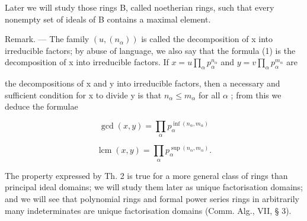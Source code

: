 Later we will study those rings B, called noetherian rings, such that every nonempty set of ideals of B contains a maximal element.

Remark. --- The family \((u, (n_{\alpha}))\) is called the decomposition of x into irreducible factors; by abuse of language, we also say that the formula (1) is the decomposition of x into irreducible factors. If \(x = u \prod_{\alpha} p_{\alpha}^{n_{\alpha}}\) and \(y = v \prod_{\alpha} p_{\alpha}^{m_{\alpha}}\) are

the decompositions of x and y into irreducible factors, then a necessary and sufficient condition for x to divide y is that \(n_{\alpha} \leqslant m_{\alpha}\) for all \(\alpha\) ; from this we deduce the formulae

\[
\operatorname * {g c d} (x, y) = \prod_ {\alpha} p _ {\alpha} ^ {\inf (n _ {\alpha}, m _ {\alpha})}\tag{2}
\]

\[
\operatorname{lcm} (x, y) = \prod_ {\alpha} p _ {\alpha} ^ {\sup \left(n _ {\alpha}, m _ {\alpha}\right)}.\tag{3}
\]

The property expressed by Th. 2 is true for a more general class of rings than principal ideal domains; we will study them later as unique factorisation domains; and we will see that polynomial rings and formal power series rings in arbitrarily many indeterminates are unique factorisation domains (Comm. Alg., VII, § 3).

